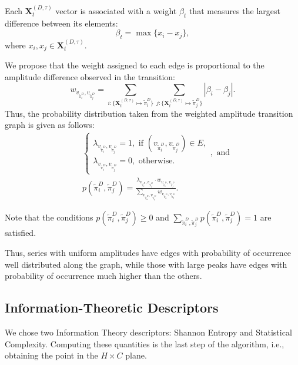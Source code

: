 \documentclass[journal]{IEEEtran}
\begin{document}
	Each $\mathbf{X}^{(D, \tau)}_t$ vector is associated with a weight $\beta_t$ that measures the largest difference between its elements:
	\begin{equation}
	\beta_t = \max\{x_i - x_j\},
	\end{equation}
	where $x_i, x_j \in \mathbf{X}^{(D, \tau)}_t$.
	
	We propose that the weight assigned to each edge is proportional to the amplitude difference observed in the transition:	
	\begin{equation}
	w_{v_{\widetilde \pi^D_i}, v_{\widetilde \pi^D_j}} =  \sum_{i : \{\mathbf{X}^{(D,\tau)}_t \mapsto \widetilde\pi^D_i\}} \sum_{j : \{\mathbf{X}^{(D,\tau)}_t \mapsto \widetilde\pi^D_j\}} |\beta_i - \beta_j| .
	\end{equation}
	Thus, the probability distribution taken from the weighted amplitude transition graph is given as follows:	
	\begin{align}
	&\left\{\begin{array}{l}
	\lambda_{v_{\widetilde\pi^D_i}, v_{\widetilde\pi^D_j}} = 1, \text{ if } (v_{\widetilde\pi^D_i}, v_{\widetilde\pi^D_j}) \in {E}, \\
	\lambda_{v_{\widetilde\pi^D_i}, v_{\widetilde\pi^D_j}} = 0, \text{ otherwise}.
	\end{array}\right., \text{ and} \\
	&p(\widetilde\pi^D_i, \widetilde\pi^D_j) = \frac{\lambda_{v_{\widetilde\pi^D_i}, v_{\widetilde\pi^D_j}} \cdot w_{v_{\widetilde\pi^D_i}, v_{\widetilde\pi^D_j}}}{\sum_{v_{\widetilde\pi^D_a}, v_{\widetilde\pi^D_b}} w_{v_{\widetilde\pi^D_a}, v_{\widetilde\pi^D_b}}}.
	\end{align}
	
	Note that the conditions $p(\widetilde\pi^D_i, \widetilde\pi^D_j) \ge 0$ and $\sum_{\widetilde\pi^D_i, \widetilde\pi^D_j} p(\widetilde\pi^D_i, \widetilde\pi^D_j) = 1$ are satisfied.
	
	Thus, series with uniform amplitudes have edges with probability of occurrence well distributed along the graph, while those with large peaks have edges with probability of occurrence much higher than the others.
	
	\subsection{Information-Theoretic Descriptors}\label{HC}
	
	We chose two Information Theory descriptors: Shannon Entropy and Statistical Complexity.
	Computing these quantities is the last step of the algorithm, i.e., obtaining the point in the $H \times C$ plane.
	
\end{document}
